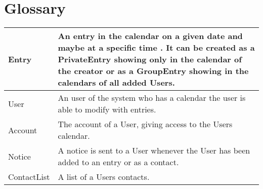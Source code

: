 \section{Glossary}
\begin{center}
    \begin{tabular}{ | l | p{10cm} |}
    \hline
    Entry & An entry in the calendar on a given date and maybe at a specific time . It can be created as a PrivateEntry showing only in the calendar of the creator or as a GroupEntry showing in the calendars of all added Users. \\ \hline
    User & An user of the system who has a calendar the user is able to modify with entries. \\ \hline
    Account & The account of a User, giving access to the Users calendar. \\ \hline
    Notice & A notice is sent to a User whenever the User has been added to an entry or as a contact. \\ \hline
	ContactList & A list of a Users contacts. \\ \hline
    \end{tabular}
\end{center}